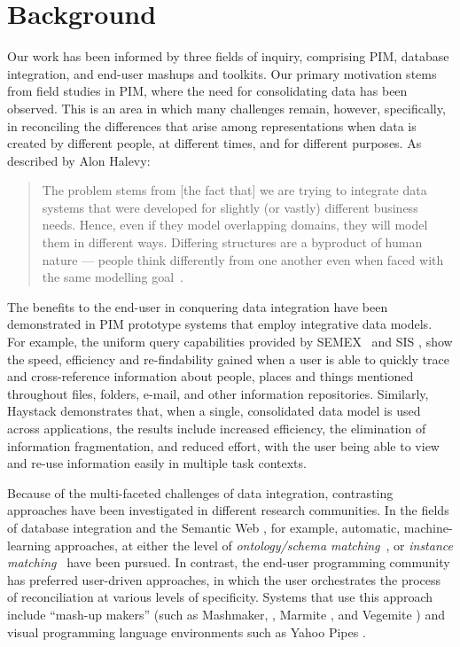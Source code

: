 \documentclass{sigchi}
\begin{document}
\section{Background}
Our work has been informed by three fields of inquiry, comprising PIM, database integration, and end-user mashups and toolkits.  Our primary motivation stems from field studies in PIM, where the need for consolidating data has been observed. This is an area in which many challenges remain, however, specifically, in reconciling the differences that arise among representations when data is created by different people, at different times, and for different purposes. As described by Alon Halevy:

\begin{quote} 
The problem stems from [the fact that] we are trying to integrate data systems that were developed for slightly (or vastly) different business needs. Hence, even if they model overlapping domains, they will model them in different ways. Differing structures are a byproduct of human nature --- people think differently from one another even when faced with the same modelling goal~\cite{halevy2006data}.
\end{quote}

The benefits to the end-user in conquering data integration have been demonstrated in PIM prototype systems that employ integrative data models.  For example, the uniform query capabilities provided by SEMEX~\cite{semex} and SIS \cite{Dumais:2003:SIS:860435.860451}, show the speed, efficiency and re-findability gained when a user is able to quickly trace and cross-reference information about people, places and things mentioned throughout files, folders, e-mail, and other information repositories.  Similarly, Haystack \cite{haystack} demonstrates that, when a single, consolidated data model is used across applications, the results include increased efficiency, the elimination of information fragmentation, and reduced effort, with the user being able to view and re-use information easily in multiple task contexts. 

Because of the multi-faceted challenges of data integration, contrasting approaches have been investigated in different research communities. In the fields of database integration and the Semantic Web \cite{Shadbolt:2006:SWR:1155313.1155373}, for example, automatic, machine-learning approaches, at either the level of \emph{ontology/schema matching}~\cite{euzenat2004api,doan2003learning}, or \emph{instance matching}~\cite{suchanek2011paris,castano2006matching} have been pursued. In contrast, the end-user programming community has preferred user-driven approaches, in which the user orchestrates the process of reconciliation at various levels of specificity.  Systems that use this approach include ``mash-up makers'' (such as Mashmaker, \cite{intel_mashmaker}, Marmite \cite{Lin:2009:EPM:1502650.1502667}, and Vegemite \cite{Wong:2007:MMM:1240624.1240842}) and visual programming language environments such as Yahoo Pipes \cite{citeulike:8887891}.
\end{document}
